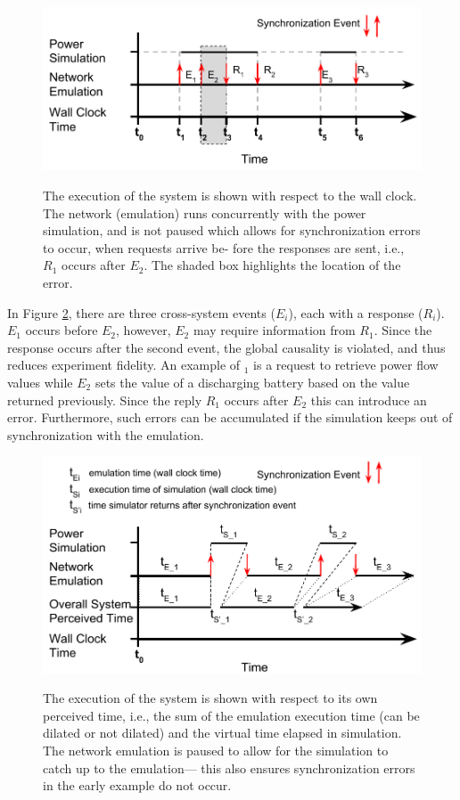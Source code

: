 \begin{figure}
  \centering
  \includegraphics[scale=0.5]{no-pause-error.pdf}
  \label{sim-err}

  \caption{
    The execution of the system is shown with respect
    to the wall clock. The network (emulation) runs concurrently
    with the power simulation, and is not paused which allows
    for synchronization errors to occur, when requests arrive be-
    fore the responses are sent, i.e., $R_1$ occurs after $E_2$. The
  shaded box highlights the location of the error.}
\end{figure}

In Figure \ref{sim-err}, there are three cross-system events ($E_i$), each
with a response ($R_i$). $E_1$ occurs before $E_2$, however, $E_2$ may
require information from $R_1$. Since the response occurs after
the second event, the global causality is violated, and thus
reduces experiment fidelity. An example of $_1$ is a request
to retrieve power flow values while $E_2$ sets the value of a
discharging battery based on the value returned previously.
Since the reply $R_1$ occurs after $E_2$ this can introduce an
error. Furthermore, such errors can be accumulated if the
simulation keeps out of synchronization with the emulation.

\begin{figure}
  \centering
  \includegraphics[scale=0.5]{wall_clock.pdf}
  \label{sim-err}

  \caption{
    The execution of the system is shown with respect
    to its own perceived time, i.e., the sum of the emulation
    execution time (can be dilated or not dilated) and the virtual
    time elapsed in simulation. The network emulation is paused
    to allow for the simulation to catch up to the emulation—
    this also ensures synchronization errors in the early example
    do not occur.
  }
\end{figure}


